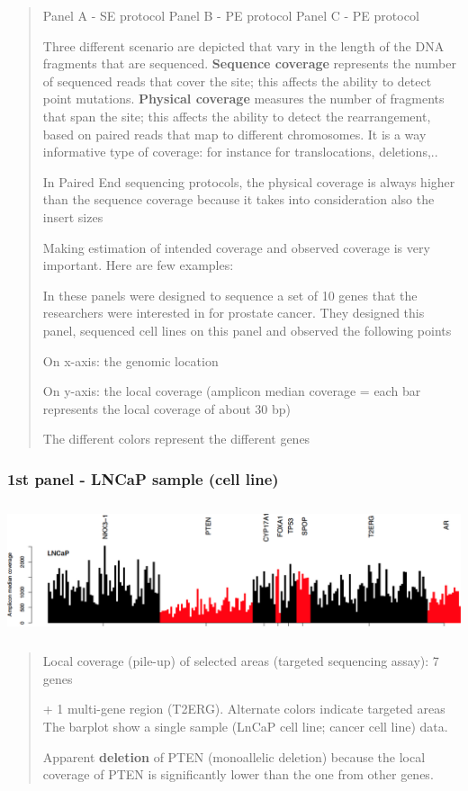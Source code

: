 \begin{quote}
Panel A - SE protocol Panel B - PE protocol Panel C - PE protocol

Three different scenario are depicted that vary in the length of the DNA
fragments that are sequenced. \textbf{Sequence coverage} represents the
number of sequenced reads that cover the site; this affects the ability
to detect point mutations. \textbf{Physical coverage} measures the
number of fragments that span the site; this affects the ability to
detect the rearrangement, based on paired reads that map to different
chromosomes. It is a way informative type of coverage: for instance for
translocations, deletions,..

In Paired End sequencing protocols, the physical coverage is always
higher than the sequence coverage because it takes into consideration
also the insert sizes

Making estimation of intended coverage and observed coverage is very
important. Here are few examples:

In these panels were designed to sequence a set of 10 genes that the
researchers were interested in for prostate cancer. They designed this
panel, sequenced cell lines on this panel and observed the following
points

On x-axis: the genomic location

On y-axis: the local coverage (amplicon median coverage = each bar
represents the local coverage of about 30 bp)

The different colors represent the different genes
\end{quote}

\hypertarget{st-panel---lncap-sample-cell-line}{%
\subsubsection{1st panel - LNCaP sample (cell
line)}\label{st-panel---lncap-sample-cell-line}}

\includegraphics[width=6.13481in,height=1.52625in]{image16.png}

\begin{quote}
Local coverage (pile-up) of selected areas (targeted sequencing assay):
7 genes

+ 1 multi-gene region (T2ERG). Alternate colors indicate targeted areas
The barplot show a single sample (LnCaP cell line; cancer cell line)
data.

Apparent \textbf{deletion} of PTEN (monoallelic deletion) because the
local coverage of PTEN is significantly lower than the one from other
genes.
\end{quote}

